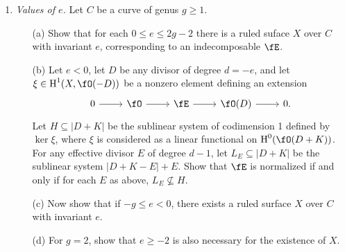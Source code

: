 \documentclass[a4paper]{article}
\begin{document}
\begin{enumerate} [label=\textbf{\arabic*.}, leftmargin=0em]
\begin{proof}
\begin{itemize} [leftmargin=0cm]
                  \item[(b)] If $g > 0$, then there is no morphism $C \to \P^1$ of degree 1.
                        If $C$ is a hyperelliptic curve, then it has a $g^1_2$, so $r = 2, 3$ is possible.
                        Otherwise, nonhyperelliptic curves of genus 3 always have a $g^1_3$ (IV, 5.5.2), so $r = 3$ is always possible.
              \end{itemize}
          \end{proof}

    \item \textit{Values of $e$.} Let $C$ be a curve of genus $g \geq 1$.
          \begin{itemize}
              \item[(a)] Show that for each $0 \leq e \leq 2g - 2$ there is a ruled suface $X$ over $C$ with invariant $e$, corresponding to an indecomposable $\fE$.
              \item[(b)] Let $e < 0$, let $D$ be any divisor of degree $d = -e$, and let $\xi \in \cH^1(X, \fO(-D))$ be a nonzero element defining an extension
                    \[ \begin{tikzcd}
                            0 \arrow[r] & \fO \arrow[r] & \fE \arrow[r] & \fO(D) \arrow[r] & 0.
                        \end{tikzcd} \]
                    Let $H \subseteq |D + K|$ be the sublinear system of codimension 1 defined by $\ker{\xi}$, where $\xi$ is considered as a linear functional on $\cH^0(\fO(D + K))$.
                    For any effective divisor $E$ of degree $d - 1$, let $L_E \subseteq |D + K|$ be the sublinear system $|D + K - E| + E$.
                    Show that $\fE$ is normalized if and only if for each $E$ as above, $L_E \nsubseteq H$.
              \item[(c)] Now show that if $-g \leq e < 0$, there exists a ruled surface $X$ over $C$ with invariant $e$.
              \item[(d)] For $g = 2$, show that $e \geq -2$ is also necessary for the existence of $X$.
          \end{itemize}


\end{enumerate}
\end{document}
